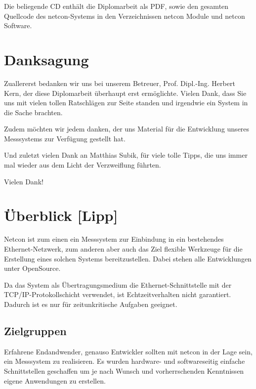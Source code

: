 \documentclass[a4paper,14pt,headsepline]{scrartcl}
\begin{document}
Die beliegende CD enthält die Diplomarbeit als PDF, sowie den gesamten Quellcode des netcon-Systems in den Verzeichnissen netcon Module und netcon Software. 

\newpage

\section*{Danksagung}
Zuallererst bedanken wir uns bei unserem Betreuer, Prof. Dipl.-Ing. Herbert Kern, der diese Diplomarbeit überhaupt erst ermöglichte. Vielen Dank, dass Sie uns mit vielen tollen Ratschlägen zur Seite standen und irgendwie ein System in die Sache brachten.

Zudem möchten wir jedem danken, der uns Material für die Entwicklung unseres Messsystems zur Verfügung gestellt hat.

Und zuletzt vielen Dank an Matthias Subik, für viele tolle Tipps, die uns immer mal wieder aus dem Licht der Verzweiflung führten.

Vielen Dank! 


\newpage


\newpage

\tableofcontents
\newpage


\section{Überblick [Lipp]}

Netcon ist zum einen ein Messsystem zur Einbindung in ein bestehendes Ethernet-Netzwerk, zum anderen aber auch das Ziel flexible Werkzeuge für die Erstellung eines solchen Systems bereitzustellen. Dabei stehen alle Entwicklungen unter OpenSource.

Da das System als Übertragungsmedium die Ethernet-Schnittstelle mit der TCP/IP-Protokollschicht verwendet, ist Echtzeitverhalten nicht garantiert. Dadurch ist es nur für zeitunkritische Aufgaben geeignet. 

\subsection{Zielgruppen}
Erfahrene Endandwender, genauso Entwickler sollten mit netcon in der Lage sein, ein Messsystem zu realisieren. Es wurden hardware- und softwareseitig einfache Schnittstellen geschaffen um je nach Wunsch und vorherrschenden Kenntnissen eigene Anwendungen zu erstellen. 
\end{document}
